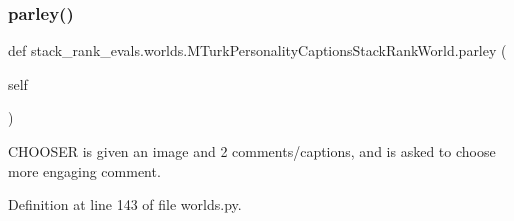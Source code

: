 \subsubsection{\texorpdfstring{parley()}{parley()}}
{\footnotesize\ttfamily def stack\+\_\+rank\+\_\+evals.\+worlds.\+M\+Turk\+Personality\+Captions\+Stack\+Rank\+World.\+parley (\begin{DoxyParamCaption}\item[{}]{self }\end{DoxyParamCaption})}

\begin{DoxyVerb}CHOOSER is given an image and 2 comments/captions, and is asked
   to choose more engaging comment.
\end{DoxyVerb}
 

Definition at line 143 of file worlds.\+py.



